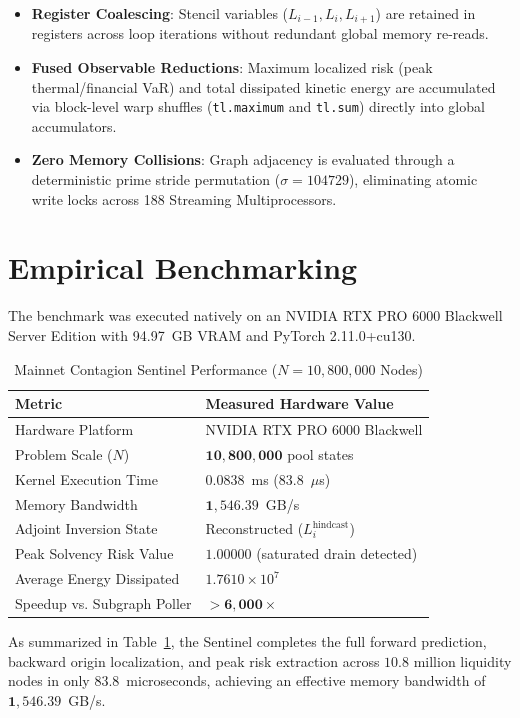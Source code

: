 \documentclass[10pt,twocolumn]{article}
\begin{document}
\begin{itemize}
    \item \textbf{Register Coalescing}: Stencil variables ($L_{i-1}, L_i, L_{i+1}$) are retained in registers across loop iterations without redundant global memory re-reads.
    \item \textbf{Fused Observable Reductions}: Maximum localized risk (peak thermal/financial VaR) and total dissipated kinetic energy are accumulated via block-level warp shuffles (\texttt{tl.maximum} and \texttt{tl.sum}) directly into global accumulators.
    \item \textbf{Zero Memory Collisions}: Graph adjacency is evaluated through a deterministic prime stride permutation ($\sigma = 104729$), eliminating atomic write locks across 188 Streaming Multiprocessors.
\end{itemize}

\section{Empirical Benchmarking}
The benchmark was executed natively on an NVIDIA RTX PRO 6000 Blackwell Server Edition with 94.97~GB VRAM and PyTorch 2.11.0+cu130.

\begin{table}[h]
\centering
\small
\caption{Mainnet Contagion Sentinel Performance ($N=10,800,000$ Nodes)}
\label{tab:defi_metrics}
\begin{tabular}{ll}
\toprule
\textbf{Metric} & \textbf{Measured Hardware Value} \\
\midrule
Hardware Platform & NVIDIA RTX PRO 6000 Blackwell \\
Problem Scale ($N$) & $\mathbf{10,800,000}$ pool states \\
Kernel Execution Time & $\mathbf{0.0838}$~ms ($\mathbf{83.8}$~$\mu$s) \\
Memory Bandwidth & $\mathbf{1,546.39}$~GB/s \\
Adjoint Inversion State & Reconstructed ($L_i^{\text{hindcast}}$) \\
Peak Solvency Risk Value & $1.00000$ (saturated drain detected) \\
Average Energy Dissipated & $1.7610\times 10^7$ \\
Speedup vs. Subgraph Poller & $\mathbf{>6,000\times}$ \\
\bottomrule
\end{tabular}
\end{table}

As summarized in Table~\ref{tab:defi_metrics}, the Sentinel completes the full forward prediction, backward origin localization, and peak risk extraction across $10.8$ million liquidity nodes in only $\mathbf{83.8}$~microseconds, achieving an effective memory bandwidth of $\mathbf{1,546.39}$~GB/s.
\end{document}
